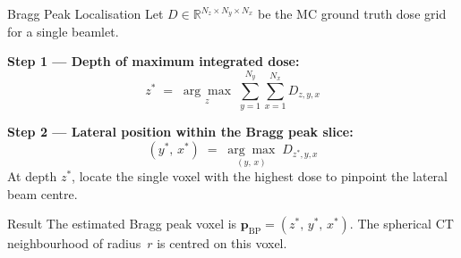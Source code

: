 \documentclass[aspectratio=169, 10pt]{beamer}
\begin{document}
\begin{frame}{Bragg Peak Localisation}
  Let $D \in \mathbb{R}^{N_z \times N_y \times N_x}$ be the MC ground truth
  dose grid for a single beamlet.

  \vspace{4pt}
  \textbf{Step 1 — Depth of maximum integrated dose:}
  \vspace{-2pt}
  \begin{equation*}
    z^{*} \;=\; \underset{z}{\arg\max} \;\sum_{y=1}^{N_y}\sum_{x=1}^{N_x} D_{z,y,x}
  \end{equation*}
  \vspace{-6pt}

  \vspace{4pt}
  \textbf{Step 2 — Lateral position within the Bragg peak slice:}
  \vspace{-2pt}
  \begin{equation*}
    (y^{*},\, x^{*}) \;=\; \underset{(y,\,x)}{\arg\max}\; D_{z^{*},y,x}
  \end{equation*}
  \vspace{-6pt}
  {\small At depth $z^{*}$, locate the single voxel with the highest dose
   to pinpoint the lateral beam centre.}

  \vspace{4pt}
  \begin{block}{Result}
    The estimated Bragg peak voxel is
    $\mathbf{p}_{\text{BP}} = (z^{*},\, y^{*},\, x^{*})$.
    The spherical CT neighbourhood of radius~$r$ is centred on this voxel.
  \end{block}
\end{frame}
\end{document}
